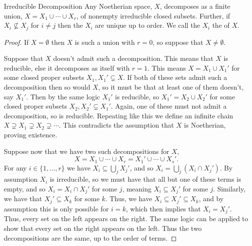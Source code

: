 \documentclass[fleqn]{NotesClass}
\begin{document}
    \begin{prp}{Irreducible Decomposition}{}
        Any Noetherian space, \(X\), decomposes as a finite union, \(X = X_1 \cup \dotsb \cup X_r\), of nonempty irreducible closed subsets.
        Further, if \(X_i \nsubseteq X_j\) for \(i \ne j\) then the \(X_i\) are unique up to order.
        We call the \(X_i\) the  of \(X\).
        \begin{proof}
            If \(X = \emptyset\) then \(X\) is such a union with \(r = 0\), so suppose that \(X \ne \emptyset\).
            
            Suppose that \(X\) doesn't admit such a decomposition.
            This means that \(X\) is reducible, else it decomposes as itself with \(r = 1\).
            This means \(X = X_1 \cup X_1'\) for some closed proper subsets \(X_1, X_1' \subsetneq X\).
            If both of these sets admit such a decomposition then so would \(X\), so it must be that at least one of them doesn't, say \(X_1'\).
            Then by the same logic \(X_1'\) is reducible, so \(X_1' = X_2 \cup X_2'\) for some closed proper subsets \(X_2, X_2' \subsetneq X_1'\).
            Again, one of these must not admit a decomposition, so is reducible.
            Repeating like this we define an infinite chain \(X \supsetneq X_1 \supsetneq X_2 \supsetneq \dotsb\).
            This contradicts the assumption that \(X\) is Noetherian, proving existence.
            
            Suppose now that we have two such decompositions for \(X\),
            \begin{equation}
                X = X_1 \cup \dotsb \cup X_r = X_1' \cup \dotsb \cup X_s'.
            \end{equation}
            For any \(i \in \{1, \dotsc, r\}\) we have \(X_i \subseteq \bigcup_j X_j'\), and so \(X_i = \bigcup_j (X_i \cap X_j')\).
            By assumption \(X_i\) is irreducible, so we must have that all but one of these terms is empty, and so \(X_i = X_i \cap X_j'\) for some \(j\), meaning \(X_i \subseteq X_j'\) for some \(j\).
            Similarly, we have that \(X_j' \subseteq X_k\) for some \(k\).
            Thus, we have \(X_i \subseteq X_j' \subseteq X_k\), and by assumption this is only possible for \(i = k\), which then implies that \(X_i = X_j'\).
            Thus, every set on the left appears on the right.
            The same logic can be applied to show that every set on the right appears on the left.
            Thus the two decompositions are the same, up to the order of terms.
        \end{proof}
    \end{prp}
    
\end{document}
